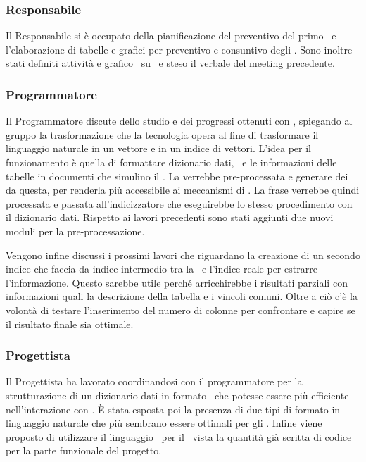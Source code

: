 \subsubsection{Responsabile} 
\par Il Responsabile si è occupato della pianificazione del preventivo del primo \ e l'elaborazione di tabelle e grafici per preventivo e consuntivo degli . Sono inoltre stati definiti attività e grafico \ su \ e steso il verbale del meeting precedente.
\subsubsection{Programmatore}
\par Il Programmatore discute dello studio e dei progressi ottenuti con , spiegando al gruppo la trasformazione che la tecnologia opera al fine di trasformare il linguaggio naturale in un vettore e in un indice di vettori. L'idea per il funzionamento è quella di formattare dizionario dati, \ e le informazioni delle tabelle in documenti che simulino il . La  verrebbe pre-processata e generare dei  da questa, per renderla più accessibile ai meccanismi di . La frase verrebbe quindi processata e passata all'indicizzatore che eseguirebbe lo stesso procedimento con il dizionario dati. Rispetto ai lavori precedenti sono stati aggiunti due nuovi moduli per la pre-processazione.
\par Vengono infine discussi i prossimi lavori che riguardano la creazione di un secondo indice che faccia da indice intermedio tra la \ e l'indice reale per estrarre l'informazione. Questo sarebbe utile perché arricchirebbe i risultati parziali con informazioni quali la descrizione della tabella e i vincoli comuni. Oltre a ciò c'è la volontà di testare l'inserimento del numero di colonne per confrontare e capire se il risultato finale sia ottimale.
\subsubsection{Progettista}
\par Il Progettista ha lavorato coordinandosi con il programmatore per la strutturazione di un dizionario dati in formato \ che potesse essere più efficiente nell'interazione con . È stata esposta poi la presenza di due tipi di formato in linguaggio naturale che più sembrano essere ottimali per gli . Infine viene proposto di utilizzare il linguaggio \ per il \ vista la quantità già scritta di codice per la parte funzionale del progetto. 

